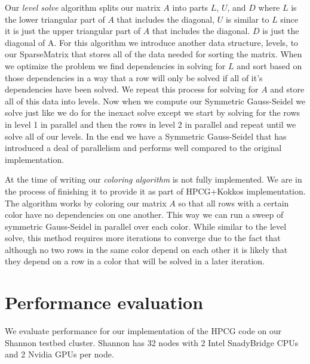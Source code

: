 \documentclass{ccr15}
\begin{document}
Our \emph{level solve} algorithm splits our matrix $A$ into parts $L$, $U$, and $D$ where $L$ is the
lower triangular part of $A$ that includes the diagonal, $U$ is similar to $L$ since it is just
the upper triangular part of $A$ that includes the diagonal. $D$ is just the diagonal of A. For
this algorithm we introduce another data structure, levels, to our SparseMatrix that stores all 
of the data needed for sorting the matrix. When we optimize the problem we find dependencies in
solving for $L$ and sort based on those dependencies in a way that a row will only be solved if
all of it's dependencies have been solved. We repeat this process for solving for $A$ and store
all of this data into levels. Now when we compute our Symmetric Gauss-Seidel we solve just like
we do for the inexact solve except we start by solving for the rows in level 1 in parallel and
then the rows in level 2 in parallel and repeat until we solve all of our levels. In the end we
have a Symmetric Gauss-Seidel that has introduced a deal of parallelism and performs well
compared to the original implementation.

At the time of writing our \emph{coloring algorithm} is not fully implemented. We are in the process of finishing it to provide it as part of HPCG+Kokkos
implementation.
The algorithm works by coloring our matrix $A$ so that all rows
with a certain color have no dependencies on one another. This way we can run a sweep of symmetric
Gauss-Seidel in parallel over each color. While similar to the level solve, this method requires more iterations
to converge due to the fact that although no two rows in the same color depend on each other it is likely
that they depend on a row in a color that will be solved in a later iteration.

\section{Performance evaluation}

We evaluate performance for our implementation of the HPCG code on our Shannon testbed cluster.  Shannon has 32 nodes with  2 Intel SnadyBridge CPUs and 2 Nvidia GPUs per node.



\end{document}
